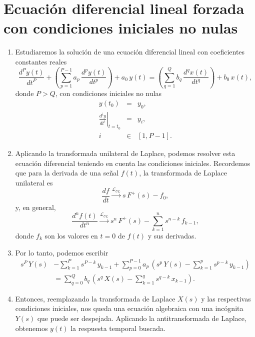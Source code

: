 \documentclass[11pt,a4paper,openany]{book}
\begin{document}
\section{Ecuaci\'{o}n diferencial lineal forzada con condiciones iniciales no nulas}

\begin{enumerate}
	\item Estudiaremos la soluci\'{o}n de una ecuaci\'{o}n diferencial lineal con coeficientes constantes reales
	\begin{equation}
		\frac{d^{P}y\left( t\right) }{dt^{P}} +
		\left(\sum_{p=1}^{P-1}a_{p} \, \frac{d^{p}y\left( t\right) }{dt^{p}}\right) + a_{0} \, y(t)= 
		\left(\sum_{q=1}^{Q}b_{q} \, \frac{d^{q}x\left( t\right) }{dt^{q}}\right)  + b_{0} \, x(t),
	\end{equation}
	donde $P > Q$, con condiciones iniciales no nulas
	\begin{eqnarray}
		y(t_{0}) &=& y_{0}, \\
		\left. \frac{d^{i}y}{dt^{i}} \right|_{t=t_{0}} &=& y_{i},\\
		i &\in& [1,P-1].
	\end{eqnarray}
	
	\item Aplicando la transformada unilateral de Laplace, podemos resolver esta ecuaci\'{o}n diferencial teniendo en cuenta las condiciones iniciales. Recordemos que para la derivada de una se\~{n}al $f(t)$, la transformada de Laplace unilateral es
	\begin{equation}
		\frac{df}{dt} \xrightarrow{\mathcal{L}_{UL}} s \, F^{+}(s) - f_{0},
	\end{equation}
	y, en general,
	\begin{equation}
		\frac{d^{n}f(t)}{dt^{n}} \xrightarrow{\mathcal{L}_{UL}}
		s^{n} \, F^{+}(s) - \sum_{k=1}^{n} s^{n-k} \, f_{k-1},
	\end{equation}
	donde $f_{k}$ son los valores en $t = 0$ de $f(t)$ y sus derivadas.
	
	\item Por lo tanto, podemos escribir
	\begin{equation}
		\begin{aligned}
			s^P \, Y(s) &- \sum_{k=1}^{P} s^{P-k} \, y_{k-1} + \sum_{p=0}^{P-1}a_{p} \, \left(s^{p} \, Y(s) - \sum_{k=1}^{p} s^{p-k} \, y_{k-1}\right) \\ 
			&= \sum_{q=0}^{Q}b_{q} \, \left(s^{q} \, X(s) - \sum_{k=1}^{q} s^{q-k} \, x_{k-1}\right).
		\end{aligned}
	\end{equation}
	
	\item Entonces, reemplazando la transformada de Laplace $X(s)$ y las respectivas condiciones iniciales, nos queda una ecuación algebraica con una incógnita $Y(s)$ que puede ser despejada. Aplicando la antitransformada de Laplace, obtenemos $y(t)$ la respuesta temporal buscada.
\end{enumerate}
\end{document}
